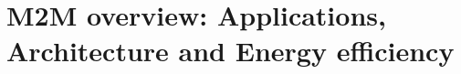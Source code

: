 \chapter{M2M overview: Applications, Architecture and Energy efficiency}
\label{chapter:m2m-overview}

\ifpdf
    \graphicspath{{Chapter2/Figures/Raster/}{Chapter2/Figures/PDF/}{Chapter2/Figures/}}
\else
    \graphicspath{{Chapter2/Figures/Vector/}{Chapter2/Figures/}}
\fi









